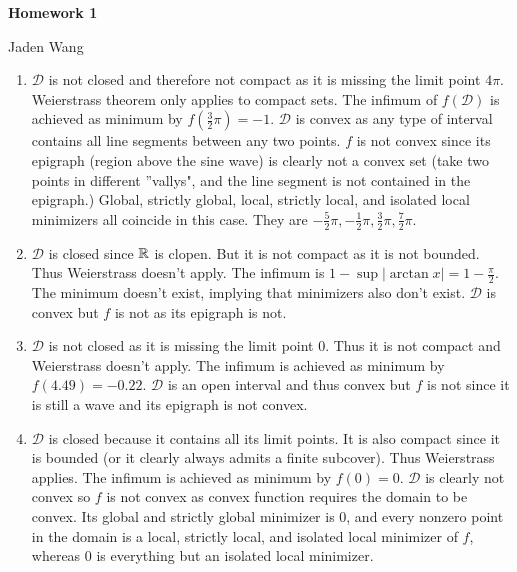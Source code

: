 \documentclass[12pt]{article}
\begin{document}
\centerline {\textsf{\textbf{\LARGE{Homework 1}}}}
\centerline {Jaden Wang}
\vspace{.15in}
\begin{problem}[1]
\begin{enumerate}[label=(\alph*)]
	\item $ \mathcal{ D}$ is not closed and therefore not compact as it is missing the limit point $ 4 \pi$. Weierstrass theorem only applies to compact sets. The infimum of $ f( \mathcal{ D})$ is achieved as minimum by $ f\left( \frac{3}{2} \pi \right) = -1$. $ \mathcal{ D}$ is convex as any type of interval contains all line segments between any two points. $ f$ is not convex since its epigraph (region above the sine wave) is clearly not a convex set (take two points in different ''vallys", and the line segment is not contained in the epigraph.) Global, strictly global, local, strictly local, and isolated local minimizers all coincide in this case. They are $-\frac{5}{2}\pi, -\frac{1}{2} \pi, \frac{3}{2}\pi, \frac{7}{2} \pi$.
	\item $ \mathcal{ D}$ is closed since $ \mathbb{R}$ is clopen. But it is not compact as it is not bounded. Thus Weierstrass doesn't apply. The infimum is $1- \sup| \arctan x| = 1 - \frac{\pi}{ 2}$. The minimum doesn't exist, implying that minimizers also don't exist. $ \mathcal{ D}$ is convex but $ f$ is not as its epigraph is not.
	\item  $ \mathcal{ D}$ is not closed as it is missing the limit point 0. Thus it is not compact and Weierstrass doesn't apply. The infimum is achieved as minimum by $ f(4.49) = -0.22$.  $ \mathcal{ D}$ is an open interval and thus convex but $ f$ is not since it is still a wave and its epigraph is not convex.
	\item  $ \mathcal{ D}$ is closed because it contains all its limit points. It is also compact since it is bounded (or it clearly always admits a finite subcover). Thus Weierstrass applies. The infimum is achieved as minimum by $ f(0) = 0$.  $ \mathcal{ D}$ is clearly not convex so $ f$ is not convex as convex function requires the domain to be convex. Its global and strictly global minimizer is 0, and every nonzero point in the domain is a local, strictly local, and isolated local minimizer of  $ f$, whereas 0 is everything but an isolated local minimizer.
\end{enumerate}
\end{problem}
\end{document}
